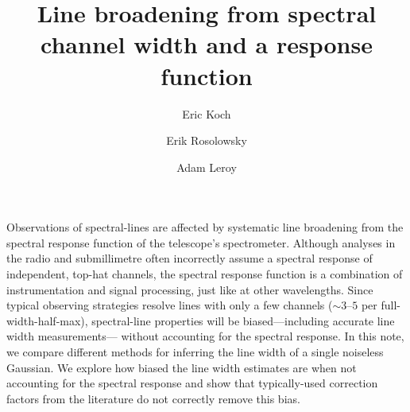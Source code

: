 \documentclass{rnaastex}
\begin{document}
\title{Line broadening from spectral channel width and a response function}

\author[0000-0001-9605-780X]{Eric Koch}
\author[0000-0002-5204-2259]{Erik Rosolowsky}

\author{Adam Leroy}


\keywords{}


\section{}


Observations of spectral-lines are affected by systematic line broadening from the spectral response function of the telescope's spectrometer. Although analyses in the radio and submillimetre often incorrectly assume a spectral response of independent, top-hat channels, the spectral response function is a combination of instrumentation and signal processing, just like at other wavelengths.  Since typical observing strategies resolve lines with only a few channels ($\sim3\mbox{--}5$ per full-width-half-max), spectral-line properties will be biased---including accurate line width measurements--- without accounting for the spectral response.  In this note, we compare different methods for inferring the line width of a single noiseless Gaussian.  We explore how biased the line width estimates are when not accounting for the spectral response and show that typically-used correction factors from the literature do not correctly remove this bias.
\end{document}
